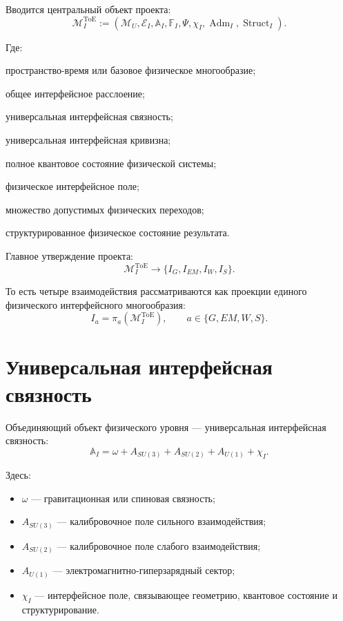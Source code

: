 \documentclass[12pt,a4paper]{article}
\DeclareMathOperator{\Adm}{Adm}
\DeclareMathOperator{\Struct}{Struct}
\newcommand{\M}{\mathcal M_U}
\newcommand{\MI}{\mathcal M_I^{\mathrm{ToE}}}
\newcommand{\EI}{\mathcal E_I}
\newcommand{\AI}{\mathbb A_I}
\newcommand{\FI}{\mathbb F_I}
\begin{document}
Вводится центральный объект проекта:
\[
\boxed{
\MI
:=
(\M,\EI,\AI,\FI,\Psi,\chi_I,\Adm_I,\Struct_I).
}
\]

Где:
\begin{description}[leftmargin=3.2em,style=nextline]
\item[\(\M\)] пространство-время или базовое физическое многообразие;
\item[\(\EI\)] общее интерфейсное расслоение;
\item[\(\AI\)] универсальная интерфейсная связность;
\item[\(\FI\)] универсальная интерфейсная кривизна;
\item[\(\Psi\)] полное квантовое состояние физической системы;
\item[\(\chi_I\)] физическое интерфейсное поле;
\item[\(\Adm_I\)] множество допустимых физических переходов;
\item[\(\Struct_I\)] структурированное физическое состояние результата.
\end{description}

Главное утверждение проекта:
\[
\boxed{
\mathcal M_I^{\mathrm{ToE}}
\longrightarrow
\{I_G,I_{EM},I_W,I_S\}.
}
\]

То есть четыре взаимодействия рассматриваются как проекции единого физического интерфейсного многообразия:
\[
\boxed{
I_a=\pi_a(\MI),
\qquad
 a\in\{G,EM,W,S\}.
}
\]

\section{Универсальная интерфейсная связность}

Объединяющий объект физического уровня --- универсальная интерфейсная связность:
\[
\boxed{
\AI
=
\omega
+
A_{SU(3)}
+
A_{SU(2)}
+
A_{U(1)}
+
\chi_I.
}
\]

Здесь:
\begin{itemize}[leftmargin=2.2em]
\item \(\omega\) --- гравитационная или спиновая связность;
\item \(A_{SU(3)}\) --- калибровочное поле сильного взаимодействия;
\item \(A_{SU(2)}\) --- калибровочное поле слабого взаимодействия;
\item \(A_{U(1)}\) --- электромагнитно-гиперзарядный сектор;
\item \(\chi_I\) --- интерфейсное поле, связывающее геометрию, квантовое состояние и структурирование.
\end{itemize}
\end{document}
